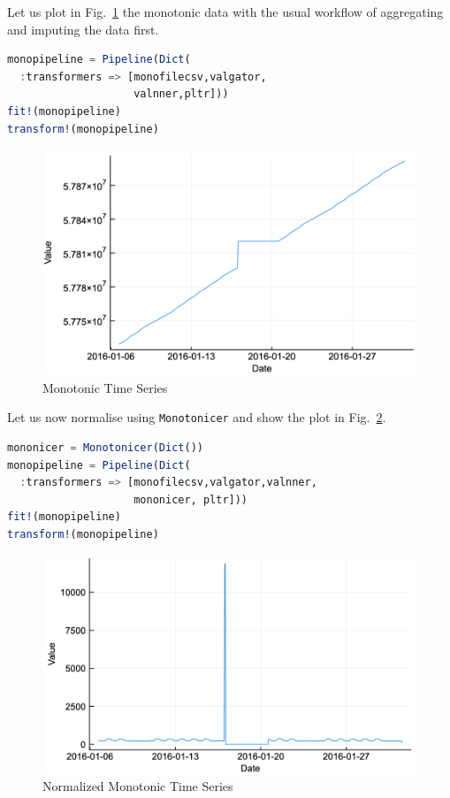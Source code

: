 \documentclass{juliacon}
\begin{document}
Let us plot in Fig.~\ref{fig:mono} the monotonic data with the usual workflow of aggregating and imputing the data first.

\begin{lstlisting}[language = Julia]
monopipeline = Pipeline(Dict(
  :transformers => [monofilecsv,valgator,
                    valnner,pltr]))
fit!(monopipeline)
transform!(monopipeline)
\end{lstlisting}

\begin{figure}[htbp]
   \centering
   \includegraphics[width=0.9\columnwidth]{mono.png} %
   \caption{Monotonic Time Series}
   \label{fig:mono}
\end{figure}

Let us now normalise using \texttt{Monotonicer} and show the plot in Fig.~\ref{fig:nmono}.

\begin{lstlisting}[language = Julia]
mononicer = Monotonicer(Dict())
monopipeline = Pipeline(Dict(
  :transformers => [monofilecsv,valgator,valnner,
                    mononicer, pltr]))
fit!(monopipeline) 
transform!(monopipeline)
\end{lstlisting}

\begin{figure}[htbp]
   \centering
   \includegraphics[width=\columnwidth]{mononicer.png} %
   \caption{Normalized Monotonic Time Series}
   \label{fig:nmono}
\end{figure}
\end{document}
